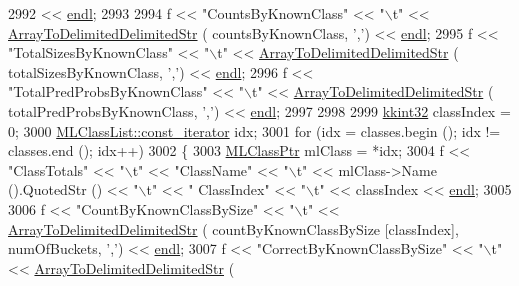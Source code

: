 \begin{DoxyCode}
2992     << \hyperlink{namespace_k_k_b_ad1f50f65af6adc8fa9e6f62d007818a8}{endl};
2993 
2994   f << \textcolor{stringliteral}{"CountsByKnownClass"}          << \textcolor{stringliteral}{"\(\backslash\)t"} << \hyperlink{_confusion_matrix2_8cpp_a5d94b5948f340aaa85dd52d3d259b65e}{ArrayToDelimitedDelimitedStr} (
      countsByKnownClass,          \textcolor{charliteral}{','}) << \hyperlink{namespace_k_k_b_ad1f50f65af6adc8fa9e6f62d007818a8}{endl};
2995   f << \textcolor{stringliteral}{"TotalSizesByKnownClass"}      << \textcolor{stringliteral}{"\(\backslash\)t"} << \hyperlink{_confusion_matrix2_8cpp_a5d94b5948f340aaa85dd52d3d259b65e}{ArrayToDelimitedDelimitedStr} (
      totalSizesByKnownClass,      \textcolor{charliteral}{','}) << \hyperlink{namespace_k_k_b_ad1f50f65af6adc8fa9e6f62d007818a8}{endl};
2996   f << \textcolor{stringliteral}{"TotalPredProbsByKnownClass"}  << \textcolor{stringliteral}{"\(\backslash\)t"} << \hyperlink{_confusion_matrix2_8cpp_a5d94b5948f340aaa85dd52d3d259b65e}{ArrayToDelimitedDelimitedStr} (
      totalPredProbsByKnownClass,  \textcolor{charliteral}{','}) << \hyperlink{namespace_k_k_b_ad1f50f65af6adc8fa9e6f62d007818a8}{endl};
2997 
2998 
2999   \hyperlink{namespace_k_k_b_a8fa4952cc84fda1de4bec1fbdd8d5b1b}{kkint32}  classIndex = 0;
3000   \hyperlink{class_k_k_b_1_1_k_k_queue_aeb057c9c010446f46f57c1e355f981f1}{MLClassList::const\_iterator}  idx;
3001   \textcolor{keywordflow}{for}  (idx = classes.begin ();  idx != classes.end ();  idx++)
3002   \{
3003     \hyperlink{class_k_k_m_l_l_1_1_m_l_class}{MLClassPtr}  mlClass = *idx;
3004     f << \textcolor{stringliteral}{"ClassTotals"}  << \textcolor{stringliteral}{"\(\backslash\)t"}  << \textcolor{stringliteral}{"ClassName"} << \textcolor{stringliteral}{"\(\backslash\)t"} << mlClass->Name ().QuotedStr  () << \textcolor{stringliteral}{"\(\backslash\)t"} << \textcolor{stringliteral}{"
      ClassIndex"} << \textcolor{stringliteral}{"\(\backslash\)t"} << classIndex << \hyperlink{namespace_k_k_b_ad1f50f65af6adc8fa9e6f62d007818a8}{endl};
3005 
3006     f << \textcolor{stringliteral}{"CountByKnownClassBySize"}    << \textcolor{stringliteral}{"\(\backslash\)t"} << \hyperlink{_confusion_matrix2_8cpp_a5d94b5948f340aaa85dd52d3d259b65e}{ArrayToDelimitedDelimitedStr} (
      countByKnownClassBySize    [classIndex], numOfBuckets,     \textcolor{charliteral}{','}) << \hyperlink{namespace_k_k_b_ad1f50f65af6adc8fa9e6f62d007818a8}{endl};
3007     f << \textcolor{stringliteral}{"CorrectByKnownClassBySize"}  << \textcolor{stringliteral}{"\(\backslash\)t"} << \hyperlink{_confusion_matrix2_8cpp_a5d94b5948f340aaa85dd52d3d259b65e}{ArrayToDelimitedDelimitedStr} (

\end{DoxyCode}
